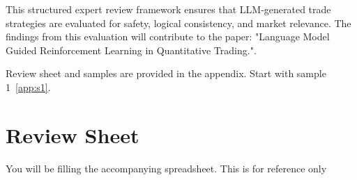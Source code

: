 \documentclass[8pt]{scrartcl}
\begin{document}
This structured expert review framework ensures that LLM-generated trade strategies are evaluated for safety, logical consistency, and market relevance. The findings from this evaluation will contribute to the paper: "Language Model Guided Reinforcement Learning in Quantitative Trading.".

Review sheet and samples are provided in the appendix. Start with sample 1~\ref{app:s1}.




\newpage

\appendix
\section*{Review Sheet}
\label{app:Review_Sheet}

You will be filling the accompanying spreadsheet. This is for reference only

\begin{table}[h]
    \centering
    \renewcommand{\arraystretch}{1.3}
    \setlength{\tabcolsep}{5pt}
    \caption{Expert Review Sheet}
\end{table}
\end{document}
